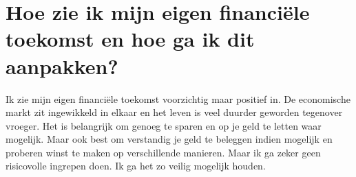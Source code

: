 \section{Hoe zie ik mijn eigen financiële toekomst en hoe ga ik dit aanpakken?}

Ik zie mijn eigen financiële toekomst voorzichtig maar positief in. De economische markt zit ingewikkeld in elkaar en het leven is veel duurder geworden tegenover vroeger. Het is belangrijk om genoeg te sparen en op je geld te letten waar mogelijk. Maar ook best om verstandig je geld te beleggen indien mogelijk en proberen winst te maken op verschillende manieren. Maar ik ga zeker geen risicovolle ingrepen doen. Ik ga het zo veilig mogelijk houden.




